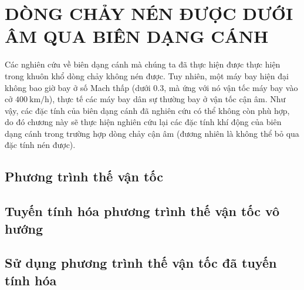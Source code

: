 \documentclass[../DONG_CHAY_NEN_DUOC.tex]{subfiles}
\begin{document}
\chapter{DÒNG CHẢY NÉN ĐƯỢC DƯỚI ÂM QUA BIÊN DẠNG CÁNH}
    Các nghiên cứu về biên dạng cánh mà chúng ta đã thực hiện được thực hiện trong khuôn khổ dòng chảy không nén được. Tuy nhiên, một máy bay hiện đại không bao giờ bay ở số Mach thấp (dưới 0.3, mà ứng với nó vận tốc máy bay vào cở $\SI{400}{\km\per\hour}$), thực tế các máy bay dân sự thường bay ở vận tốc cận âm. Như vậy, các đặc tính của biên dạng cánh đã nghiên cứu có thể không còn phù hợp, do đó chương này sẽ thực hiện nghiên cứu lại các đặc tính khí động của biên dạng cánh trong trường hợp dòng chảy cận âm (đương nhiên là không thể bỏ qua đặc tính nén được).
    \section{Phương trình thế vận tốc}
        
    \section{Tuyến tính hóa phương trình thế vận tốc vô hướng}
        
    \section{Sử dụng phương trình thế vận tốc đã tuyến tính hóa}
        
\end{document}
